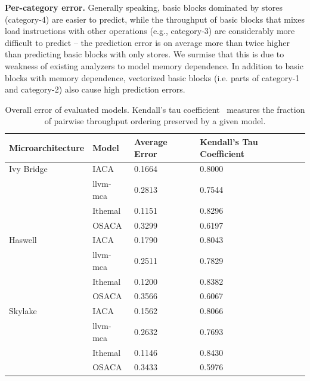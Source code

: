 \textbf{Per-category error.} Generally speaking, basic blocks dominated by stores
(category-4) are easier to predict,
while the throughput of basic blocks that mixes load instructions
with other operations (e.g., category-3) are considerably
more difficult to predict -- the prediction error is on average more than
twice higher than predicting basic blocks with only stores. 
We surmise that this is due to weakness of existing analyzers to model 
memory dependence.
In addition to basic blocks with memory dependence,
vectorized basic blocks (i.e. parts of category-1 and category-2) also cause high prediction errors.
\fi



\begin{table}
\begin{tabular}
{|p{}|p{}|p{}|p{}|}
\hline

\textbf{Microarchitecture} & \textbf{Model} &
\textbf{Average Error} & \textbf{Kendall's Tau Coefficient} \\
\hline

Ivy Bridge & IACA & 0.1664 & 0.8000\\
    & llvm-mca & 0.2813 & 0.7544\\
    & Ithemal & 0.1151 & 0.8296\\
    & OSACA & 0.3299 & 0.6197\\
\hline

Haswell & IACA & 0.1790 & 0.8043\\
    & llvm-mca & 0.2511 & 0.7829\\
    & Ithemal & 0.1200 & 0.8382\\
    & OSACA & 0.3566 & 0.6067\\
    
\hline 
Skylake & IACA & 0.1562 & 0.8066\\
    & llvm-mca & 0.2632 & 0.7693\\
    & Ithemal & 0.1146 & 0.8430\\
    & OSACA & 0.3433 & 0.5976\\

\hline
\end{tabular}
\\
\caption{Overall error of evaluated models. Kendall's tau coefficient~\cite{kendalltau}
measures the fraction of pairwise throughput ordering preserved by a given model.}
\label{tab:overall}
\end{table}


